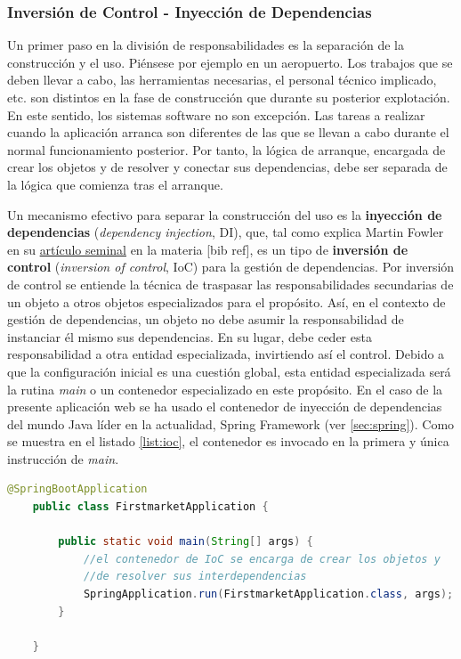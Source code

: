 \documentclass[a4paper]{article}
\begin{document}
    \subsubsection[Inversión de Control]{Inversión de Control - Inyección de Dependencias} \label{sec:ioc}
    Un primer paso en la división de responsabilidades es la separación de la construcción y el uso. Piénsese por ejemplo en un aeropuerto. Los trabajos que se deben llevar a cabo, las herramientas necesarias, el personal técnico implicado, etc. son distintos en la fase de construcción que durante su posterior explotación. En este sentido, los sistemas software no son excepción. Las tareas a realizar cuando la aplicación arranca son diferentes de las que se llevan a cabo durante el normal funcionamiento posterior. Por tanto, la lógica de arranque, encargada de crear los objetos y de resolver y conectar sus dependencias, debe ser separada de la lógica que comienza tras el arranque.
    
    Un mecanismo efectivo para separar la construcción del uso es la \textbf{inyección de dependencias} (\emph{dependency injection}, DI), que, tal como explica Martin Fowler en su \href{https://martinfowler.com/articles/injection.html}{artículo seminal} en la materia [bib ref], es un tipo de \textbf{inversión de control} (\emph{inversion of control}, IoC) para la gestión de dependencias. Por inversión de control se entiende la técnica de traspasar las responsabilidades secundarias de un objeto a otros objetos especializados para el propósito. Así, en el contexto de gestión de dependencias, un objeto no debe asumir la responsabilidad de instanciar él mismo sus dependencias. En su lugar, debe ceder esta responsabilidad a otra entidad especializada, invirtiendo así el control. Debido a que la configuración inicial es una cuestión global, esta entidad especializada será la rutina \emph{main} o un contenedor especializado en este propósito. En el caso de la presente aplicación web se ha usado el contenedor de inyección de dependencias del mundo Java líder en la actualidad, Spring Framework (ver \ref{sec:spring}). Como se muestra en el listado \ref{list:ioc}, el contenedor es invocado en la primera y única instrucción de \emph{main}.
    \\
    
    \begin{lstlisting}[language=Java,caption=Inversión de control de dependencias,label=list:ioc]
    @SpringBootApplication
    public class FirstmarketApplication {
    
    	public static void main(String[] args) {
    		//el contenedor de IoC se encarga de crear los objetos y 
    		//de resolver sus interdependencias
    		SpringApplication.run(FirstmarketApplication.class, args);
    	}
    
    }
    \end{lstlisting}
    
\end{document}
